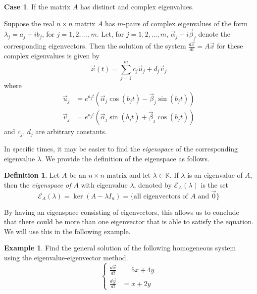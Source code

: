 \documentclass[11pt]{book}
\theoremstyle{definition}\newtheorem{definition}[subsection]{Definition}
\theoremstyle{definition}\newtheorem{example}[subsection]{Example}
\theoremstyle{definition}\newtheorem{notation}[subsection]{Notation}
\theoremstyle{definition}\newtheorem{remark}[subsection]{Remark}
\theoremstyle{theorem}\newtheorem{theorem}[subsection]{Theorem}
\theoremstyle{theorem}\newtheorem{lemma}[subsection]{Lemma}
\theoremstyle{theorem}\newtheorem{proposition}[subsection]{Proposition}
\theoremstyle{theorem}\newtheorem{corollary}[subsection]{Corollary}
\theoremstyle{theorem}\newtheorem{case}{Case}
\theoremstyle{remark}\newtheorem{subcase}{Subcase}[case]
\newcommand{\K}{\mathbb{K}}
\newcommand{\E}{\mathcal{E}}
\begin{document}
\begin{case}
    If the matrix $A$ has distinct and complex eigenvalues.
\end{case}

Suppose the real $n \times n$ matrix $A$ has $m$-pairs of complex eigenvalues of the form $\lambda_j = a_j + ib_j$, for $j = 1, 2,..., m$. Let, for $j = 1, 2,..., m$, $\vec{\alpha}_j + i\vec{\beta}_j$ denote the corresponding eigenvectors. Then the solution of the system $\frac{d\vec{x}}{dt} = A\vec{x}$ for these complex eigenvalues is given by
\begin{equation*}
    \vec{x}(t) = \sum_{j = 1}^{m} c_j\vec{u}_j + d_j\vec{v}_j
\end{equation*}
where 
\begin{align*}
    \vec{u}_j &= e^{a_j t}\left(\vec{\alpha}_j\cos(b_jt) - \vec{\beta}_j\sin(b_jt)\right) \\
    \vec{v}_j &= e^{a_j t}\left(\vec{\alpha}_j\sin(b_jt) + \vec{\beta}_j\cos(b_jt)\right)
\end{align*}
and $c_j$, $d_j$ are arbitrary constants. 

In specific times, it may be easier to find the \emph{eigenspace} of the corresponding eigenvalue $\lambda$. We provide the definition of the eigenspace as follows.

\begin{definition}\label{definition:1.2.2}
    Let $A$ be an $n \times n$ matrix and let $\lambda \in \K$. If $\lambda$ is an eigenvalue of $A$, then the \emph{eigenspace of $A$} with eigenvalue $\lambda$, denoted by $\E_A(\lambda)$ is the set
    \begin{equation*}
        \E_A(\lambda) = \ker(A - \lambda I_n) = \{\text{all eigenvectors of $A$ and $\vec{0}$}\}
    \end{equation*}
\end{definition}

By having an eigenspace consisting of eigenvectors, this allows us to conclude that there could be more than one eigenvector that is able to satisfy the equation. We will use this in the following example.

\begin{example}\label{example:1.2.3}
    Find the general solution of the following homogeneous system using the eigenvalue-eigenvector method.
    \begin{equation*}
        \begin{cases}
            \frac{d\vec{x}}{dt} &= 5x + 4y \\
            \frac{d\vec{y}}{dt} &= x + 2y
        \end{cases}
    \end{equation*}
\end{example}
\end{document}
